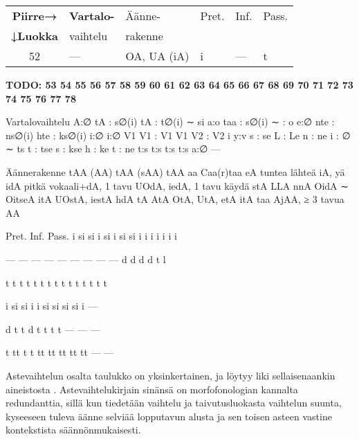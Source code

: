 \documentclass[free]{flammie}
\begin{document}
\begin{table}
    \label{Verbiluokkien äänne- ja muotorakenne sekä
    muut erottavat piirteet}
    \begin{tabular}{|c||l|l|l|l|l|}
        \hline
        \bf Piirre→ &
        \bf Vartalo- & Äänne- & Pret. & Inf. & Pass. \\
        \bf ↓Luokka &
        vaihtelu & rakenne & & & \\
        \hline
        52 & — & OA, UA (iA) & i & — & t \\
        \hline
    \end{tabular}
    \bf TODO:
53
54
55
56
57
58
59
60
61
62
63
64
65
66
67
68
69
70
71
72
73
74
75
76
77
78

Vartalovaihtelu
A:∅
tA : s∅(i)
tA : t∅(i) ∼ si
a:o
taa : s∅(i) ∼ : o
e:∅
nte : ns∅(i)
hte : ks∅(i)
i:∅
i:∅
V1 V1 : V1
V1 V2 : V2 i
y:v
s : se
L : Le
n : ne
i : ∅ ∼ ts
t : tse
s : kse
h : ke
t : ne
t:s
t:s
t:s
t:s
a:∅
—

Äännerakenne
tAA (AA)
tAA (sAA)
tAA
aa
Caa(r)taa
eA
tuntea
lähteä
iA, yä
idA
pitkä vokaali+dA, 1 tavu
UOdA, iedA, 1 tavu
käydä
stA
LLA
nnA
OidA ∼ OitseA
itA
UOstA, iestA
hdA
tA
AtA
OtA, UtA, etA
itA
taa
AjAA, ≥ 3 tavua
AA

Pret. Inf. Pass.
i
si
si
i
si
i
si
si
i
i
i
i
i
i
i

—
—
—
—
—
—
—
—
—
d
d
d
d
t
l

t
t
t
t
t
t
t
t
t
t
t
t
t
t
t

i
si
si
i
i
si
si
si
si
i
—

d
t
t
d
t
t
t
t
—
—
—

t
tt
t
t
tt
tt
tt
tt
tt
—
—
\end{table}

Astevaihtelun osalta taulukko on yksinkertainen, ja löytyy liki sellaisenaankin
aineistosta \cite{nykysuomensanalista2006}. Astevaihtelukirjain
sinänsä on morfofonologian kannalta redundanttia, sillä kun tiedetään vaihtelu
ja taivutusluokasta vaihtelun suunta, kyseeseen tuleva äänne selviää lopputavun
alusta ja sen toisen asteen vastine kontekstista säännönmukaisesti.
\end{document}
